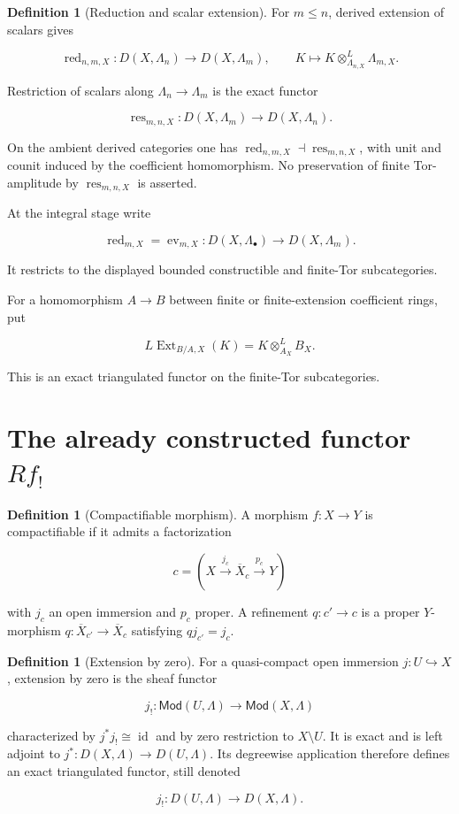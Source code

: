\documentclass[10pt]{article}
\theoremstyle{definition}
\newtheorem{definition}[theorem]{Definition}
\newcommand{\red}{\operatorname{red}}
\begin{document}
\begin{definition}[Reduction and scalar extension]
For \(m\leq n\), derived extension of scalars gives

\[
 \red_{n,m,X}:D(X,\Lambda_n)\longrightarrow D(X,\Lambda_m),
 \qquad K\longmapsto K\otimes^L_{\Lambda_{n,X}}\Lambda_{m,X}.
\]

Restriction of scalars along \(\Lambda_n\to\Lambda_m\) is the exact functor

\[
 \operatorname{res}_{m,n,X}:D(X,\Lambda_m)\longrightarrow D(X,\Lambda_n).
\]

On the ambient derived categories one has
\(\red_{n,m,X}\dashv\operatorname{res}_{m,n,X}\), with unit and counit
induced by the coefficient homomorphism.  No preservation of finite
Tor-amplitude by \(\operatorname{res}_{m,n,X}\) is asserted.

At the integral stage write

\[
 \red_{m,X}=\operatorname{ev}_{m,X}:
 D(X,\Lambda_\bullet)\longrightarrow D(X,\Lambda_m).
\]

It restricts to the displayed bounded constructible and finite-Tor
subcategories.

For a homomorphism \(A\to B\) between finite or finite-extension coefficient
rings, put

\[
 L\operatorname{Ext}_{B/A,X}(K)=K\otimes^L_{A_X}B_X.
\]

This is an exact triangulated functor on the finite-Tor subcategories.
\end{definition}

\section{The already constructed functor \texorpdfstring{\(Rf_!\)}{Rf!}}

\begin{definition}[Compactifiable morphism]
A morphism \(f:X\to Y\) is compactifiable if it admits a factorization

\[
 c=(X\xrightarrow{j_c}\overline X_c\xrightarrow{p_c}Y)
\]

with \(j_c\) an open immersion and \(p_c\) proper.  A refinement
\(q:c'\to c\) is a proper \(Y\)-morphism
\(q:\overline X_{c'}\to\overline X_c\) satisfying
\(qj_{c'}=j_c\).
\end{definition}

\begin{definition}[Extension by zero]
For a quasi-compact open immersion \(j:U\hookrightarrow X\), extension by
zero is the sheaf functor

\[
 j_!: \mathsf{Mod}(U,\Lambda)\longrightarrow
       \mathsf{Mod}(X,\Lambda)
\]

characterized by \(j^*j_!\cong\operatorname{id}\) and by zero restriction
to \(X\setminus U\).  It is exact and is left adjoint to
\(j^*:D(X,\Lambda)\to D(U,\Lambda)\).  Its degreewise application therefore
defines an exact triangulated functor, still denoted

\[
 j_!:D(U,\Lambda)\longrightarrow D(X,\Lambda).
\]
\end{definition}
\end{document}
